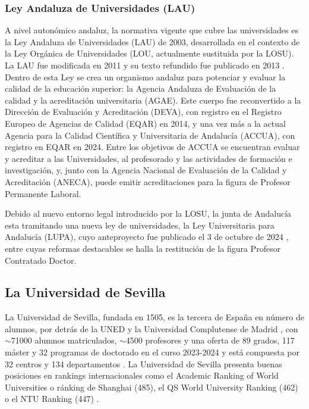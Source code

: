 \documentclass[a4paper,12pt,twoside]{article}
\begin{document}
\subsubsection{Ley Andaluza de Universidades (LAU)}

A nivel autonómico andaluz, la normativa vigente que cubre las universidades es la Ley Andaluza de Universidades (LAU) de 2003, desarrollada en el contexto de la Ley Orgánica de Universidades (LOU, actualmente sustituida por la LOSU). La LAU fue modificada en 2011 y su texto refundido fue publicado en 2013 \cite{lau}. Dentro de esta Ley se crea un organismo andaluz para potenciar y evaluar la calidad de la educación superior: la Agencia Andaluza de Evaluación de la calidad y la acreditación universitaria (AGAE). Este cuerpo fue reconvertido a la Dirección de Evaluación y Acreditación (DEVA), con registro en el Registro Europeo de Agencias de Calidad (EQAR) en 2014, y una vez más a la actual Agencia para la Calidad Científica y Universitaria de Andalucía (ACCUA), con registro en EQAR en 2024. Entre los objetivos de ACCUA se encuentran evaluar y acreditar a las Universidades, al profesorado y las actividades de formación e investigación, y, junto con la Agencia Nacional de Evaluación de la Calidad y Acreditación (ANECA), puede emitir acreditaciones para la figura de Profesor Permanente Laboral.

Debido al nuevo entorno legal introducido por la LOSU, la junta de Andalucía esta tramitando una nueva ley de universidades, la Ley Universitaria para Andalucía (LUPA), cuyo anteproyecto fue publicado el 3 de octubre de 2024 \cite{lupa}, entre cuyas reformas destacables se halla la restitución de la figura Profesor Contratado Doctor.

\subsection{La Universidad de Sevilla}

La Universidad de Sevilla, fundada en 1505, es la tercera de España en número de alumnos, por detrás de la UNED y la Universidad Complutense de Madrid \cite{cifras}, con $\sim$71000 alumnos matriculados, $\sim$4500 profesores y una oferta de 89 grados, 117 máster y 32 programas de doctorado en el curso 2023-2024 y está compuesta por 32 centros y 134 departamentos \cite{us}. La Universidad de Sevilla presenta buenas posiciones en rankings internacionales como el Academic Ranking of World Universities o ránking de Shanghai (485), el QS World University Ranking (462) o el NTU Ranking (447) \cite{us}.
\end{document}
